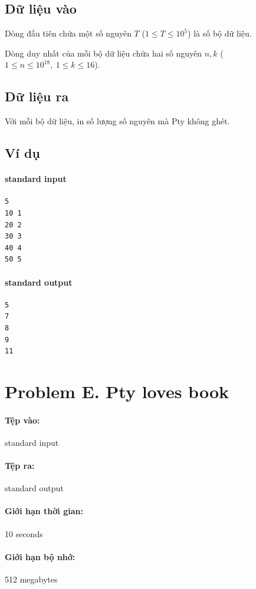 \documentclass[11pt]{article}
\begin{document}
\subsection*{Dữ liệu vào}

Dòng đầu tiên chứa một số nguyên \(T\) (\(1\le T\le 10^5\)) là số bộ dữ liệu.

Dòng duy nhất của mỗi bộ dữ liệu chứa hai số nguyên \(n,k\)
(\(1\le n\le 10^{18},\ 1\le k\le 16\)).

\subsection*{Dữ liệu ra}

Với mỗi bộ dữ liệu, in số lượng số nguyên mà Pty không ghét.

\subsection*{Ví dụ}

\paragraph{standard input}
\begin{verbatim}
5
10 1
20 2
30 3
40 4
50 5
\end{verbatim}

\paragraph{standard output}
\begin{verbatim}
5
7
8
9
11
\end{verbatim}

\section{Problem E. Pty loves book}

\paragraph{Tệp vào:} standard input
\paragraph{Tệp ra:} standard output
\paragraph{Giới hạn thời gian:} 10 seconds
\paragraph{Giới hạn bộ nhớ:} 512 megabytes
\end{document}
